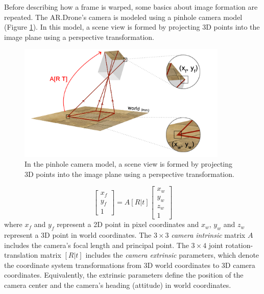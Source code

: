 Before describing how a frame is warped, some basics about image formation are repeated. %
The AR.Drone's camera is modeled using a pinhole camera model (Figure \ref{fig:mapping1}).
In this model, a scene view is formed by projecting 3D points into the image plane using a perspective transformation.

\begin{figure}[htb]
\centering
\includegraphics[width=10cm]{images/mapping0.png}
\caption{In the pinhole camera model, a scene view is formed by projecting 3D points into the image plane using a perspective transformation.}
\label{fig:mapping1}
\end{figure}

\begin{equation}
\left[ {
\begin{array}{c} x_f \\ y_f \\ 1 \end{array}
} \right]
= A[R|t]
\left[ {
\begin{array}{c} x_w \\ y_w \\ z_w \\ 1 \end{array}
} \right]
\end{equation}
where $x_f$ and $y_f$ represent a 2D point in pixel coordinates and $x_w$, $y_w$ and $z_w$ represent a 3D point in world coordinates.
The $3 \times 3$ \textit{camera intrinsic} matrix $A$ includes the camera's focal length and principal point.
The $3 \times 4$ joint rotation-translation matrix $[R|t]$ includes the \textit{camera extrinsic} parameters, which denote the coordinate system transformations from 3D world coordinates to 3D camera coordinates. Equivalently, the extrinsic parameters define the position of the camera center and the camera's heading (attitude) in world coordinates.


